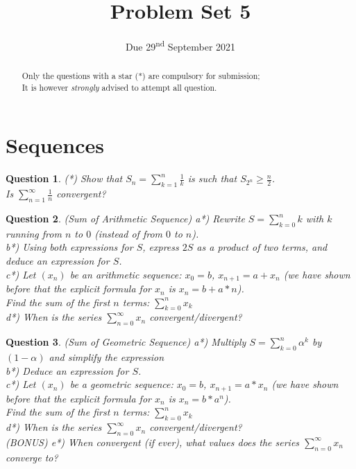 \documentclass[]{article}
\title{Problem Set 5}
\author{}
\date{Due 29\textsuperscript{nd} September 2021}
\newtheorem{question}{Question}
\begin{document}
\maketitle

\begin{abstract}
	Only the questions with a star (*) are compulsory for submission;\\
	It is however \textit{strongly} advised to attempt all question.
\end{abstract}

\section{Sequences}
\begin{question}
	(*) Show that $S_n = \sum_{k=1}^{n}\frac{1}{k}$ is such that $S_{2^n} \geq \frac{n}{2}$.\\
	Is $\sum_{n=1}^{\infty} \frac{1}{n}$ convergent?
\end{question}

\begin{question}(Sum of Arithmetic Sequence)
	a*) Rewrite $S=\sum_{k=0}^{n}k$ with $k$ running from $n$ to $0$ (instead of from $0$ to $n$).\\
	b*) Using both expressions for $S$, express $2S$ as a product of two terms, and deduce an expression for $S$.\\
	c*) Let $(x_n)$ be an arithmetic sequence: $x_0=b$, $x_{n+1}=a+x_n$ (we have shown before that the explicit formula for $x_n$ is $x_n=b+a*n$).\\
	Find the sum of the first $n$ terms: $\sum_{k=0}^{n}x_k$\\
	d*) When is the series $\sum_{n=0}^{\infty}x_n$ convergent/divergent?
\end{question}
\begin{question}(Sum of Geometric  Sequence)
	a*) Multiply $S=\sum_{k=0}^{n}\alpha^k$ by $(1-\alpha)$ and simplify the expression\\
	b*) Deduce an expression for $S$.\\
	c*) Let $(x_n)$ be a geometric sequence: $x_0=b$, $x_{n+1}=a*x_n$ (we have shown before that the explicit formula for $x_n$ is $x_n=b*a^n$).\\
	Find the sum of the first $n$ terms: $\sum_{k=0}^{n}x_k$\\
	d*) When is the series $\sum_{n=0}^{\infty}x_n$ convergent/divergent?\\
	(BONUS) e*) When convergent (if ever), what values does the series $\sum_{n=0}^{\infty}x_n$ converge to?
\end{question}
\end{document}
